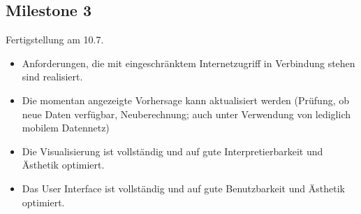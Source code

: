 \documentclass{article}
\begin{document}
	\vspace{1em}

	\subsection*{Milestone 3}
	Fertigstellung am 10.7.
	\begin{itemize} 
	 	 \item Anforderungen, die mit eingeschränktem Internetzugriff in Verbindung stehen sind realisiert.
	 	 \item Die momentan angezeigte Vorhersage kann aktualisiert werden (Prüfung, ob neue Daten verfügbar, Neuberechnung; auch unter Verwendung von lediglich mobilem Datennetz)
	 	 \item Die Visualisierung ist vollständig und auf gute Interpretierbarkeit und Ästhetik optimiert.
	 	 \item Das User Interface ist vollständig und auf gute Benutzbarkeit und Ästhetik optimiert.
	\end{itemize} 
\end{document}
